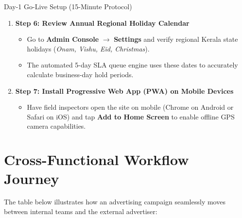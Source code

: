 \documentclass[11pt,a4paper]{article}
\begin{document}
\begin{checklistbox}{Day-1 Go-Live Setup (15-Minute Protocol)}
\begin{enumerate}[leftmargin=1.4em, itemsep=4pt]
\begin{itemize}[leftmargin=1em, itemsep=2pt]
        \item Navigate to \textbf{Admin Console} $\rightarrow$ \textbf{User Management} (\texttt{/admin}).
        \item Create user accounts for your \textbf{Sales Executives}, \textbf{Operations Staff}, and \textbf{Finance Officers}.
    \end{itemize}
    \item[\textbf{[ ]}] \textbf{Step 6: Review Annual Regional Holiday Calendar}
    \begin{itemize}[leftmargin=1em, itemsep=2pt]
        \item Go to \textbf{Admin Console} $\rightarrow$ \textbf{Settings} and verify regional Kerala state holidays (\textit{Onam, Vishu, Eid, Christmas}).
        \item The automated 5-day SLA queue engine uses these dates to accurately calculate business-day hold periods.
    \end{itemize}
    \item[\textbf{[ ]}] \textbf{Step 7: Install Progressive Web App (PWA) on Mobile Devices}
    \begin{itemize}[leftmargin=1em, itemsep=2pt]
        \item Have field inspectors open the site on mobile (Chrome on Android or Safari on iOS) and tap \textbf{Add to Home Screen} to enable offline GPS camera capabilities.
    \end{itemize}
\end{enumerate}
\end{checklistbox}

\newpage

\section{Cross-Functional Workflow Journey}

The table below illustrates how an advertising campaign seamlessly moves between internal teams and the external advertiser:

\vspace{0.3cm}
\end{document}
